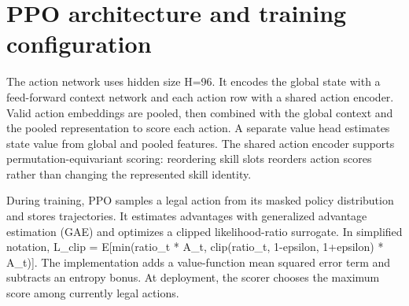 \documentclass{ieeeaccess}
\begin{document}
\begin{table}[t]\centering\small

\caption{Table 3. Training notebook and evaluation environment}


\end{table}

\section{PPO architecture and training configuration}

The action network uses hidden size H=96. It encodes the global state with a feed-forward context network and each action row with a shared action encoder. Valid action embeddings are pooled, then combined with the global context and the pooled representation to score each action. A separate value head estimates state value from global and pooled features. The shared action encoder supports permutation-equivariant scoring: reordering skill slots reorders action scores rather than changing the represented skill identity.

During training, PPO samples a legal action from its masked policy distribution and stores trajectories. It estimates advantages with generalized advantage estimation (GAE) and optimizes a clipped likelihood-ratio surrogate. In simplified notation, L\_clip = E[min(ratio\_t * A\_t, clip(ratio\_t, 1-epsilon, 1+epsilon) * A\_t)]. The implementation adds a value-function mean squared error term and subtracts an entropy bonus. At deployment, the scorer chooses the maximum score among currently legal actions.
\end{document}
